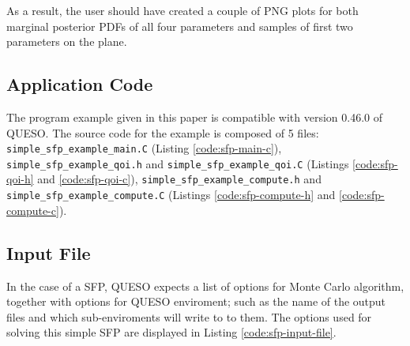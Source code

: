 As a result, the user should have created a couple of PNG plots for both
marginal posterior PDFs of all four parameters and samples of first two
parameters on the plane.




\subsection{Application Code}\label{sec:code-sfp}


The program example given in this paper is compatible with version 0.46.0 of QUESO.
The source code for the example is composed of 5 files:
\texttt{simple\_sfp\_example\_main.C} (Listing \ref{code:sfp-main-c}),
\texttt{simple\_sfp\_example\_qoi.h} and \texttt{simple\_sfp\_example\_qoi.C} (Listings \ref{code:sfp-qoi-h} and \ref{code:sfp-qoi-c}),
\texttt{simple\_sfp\_example\_compute.h}  and \texttt{simple\_sfp\_example\_compute.C} (Listings \ref{code:sfp-compute-h} and \ref{code:sfp-compute-c}).











 


\subsection{Input File}\label{sec:sfp-input-file}

In the case of a SFP, QUESO expects a list of options for Monte Carlo algorithm,
together with options for QUESO enviroment; such as the name of the output files and which sub-enviroments will write to to them. 
The options used for solving this simple SFP are displayed in Listing \ref{code:sfp-input-file}.


